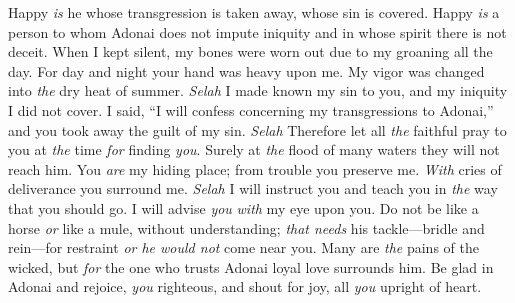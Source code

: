 \begin{biblechapter} %
 Happy \textit{is} he whose transgression is taken away, 
whose sin is covered.
\verse Happy \textit{is} a person to whom Adonai does not impute iniquity 
and in whose spirit there is not deceit.
\verse When I kept silent, my bones were worn out 
due to my groaning all the day.
\verse For day and night your hand was heavy upon me. 
My vigor was changed into \textit{the} dry heat of summer. \textit{Selah}
\verse I made known my sin to you, and my iniquity I did not cover. 
I said, “I will confess concerning my transgressions to Adonai,” 
and you took away the guilt of my sin. \textit{Selah}
\verse Therefore let all \textit{the} faithful pray to you 
at \textit{the} time \textit{for} finding \textit{you}. 
Surely at \textit{the} flood of many waters they will not reach him.
\verse You \textit{are} my hiding place; 
from trouble you preserve me. 
\textit{With} cries of deliverance you surround me. \textit{Selah}
\verse I will instruct you and teach you 
in \textit{the} way that you should go. 
I will advise \textit{you} \textit{with} my eye upon you.
\verse Do not be like a horse \textit{or} like a mule, without understanding; 
\textit{that needs} his tackle—bridle and rein—for restraint 
\textit{or he would not} come near you.
\verse Many are \textit{the} pains of the wicked, 
but \textit{for} the one who trusts Adonai 
loyal love surrounds him.
\verse Be glad in Adonai and rejoice, \textit{you} righteous, 
and shout for joy, all \textit{you} upright of heart.
\end{biblechapter}

